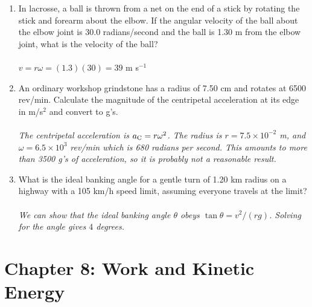 \documentclass[10pt]{article}
\begin{document}
\begin{enumerate}
\item In lacrosse, a ball is thrown from a net on the end of a stick by rotating the stick and forearm about the elbow. If the angular velocity of the ball about the elbow joint is 30.0 radians/second and the ball is 1.30 m from the elbow joint, what is the velocity
of the ball? \\ \\
$v = r\omega = (1.3)(30) = 39$ m s$^{-1}$
\item An ordinary workshop grindstone has a radius of 7.50 cm and rotates at 6500 rev/min.  Calculate the magnitude of the centripetal acceleration at its edge in m/s$^2$ and convert to g's. \\ \\
\textit{The centripetal acceleration is $a_{\rm C} = r \omega^2$.  The radius is $r = 7.5 \times 10^{-2}$ m, and $\omega = 6.5 \times 10^3$ rev/min which is 680 radians per second.  This amounts to more than 3500 g's of acceleration, so it is probably not a reasonable result.}
\item What is the ideal banking angle for a gentle turn of 1.20 km radius on a highway with a 105 km/h speed limit, assuming everyone travels at the limit? \\\ \\
\textit{We can show that the ideal banking angle $\theta$ obeys $\tan\theta = v^2/(rg)$.  Solving for the angle gives $4$ degrees.}
\end{enumerate}

\section{Chapter 8: Work and Kinetic Energy}
\end{document}
